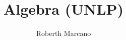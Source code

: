 \documentclass[a4paper,12pt]{book}
\begin{document}
	
	\author{Roberth Marcano}
	\title{Algebra (UNLP)}
	
	\maketitle
	\tableofcontents
	
	
	
	
	\backmatter
	
\end{document}

